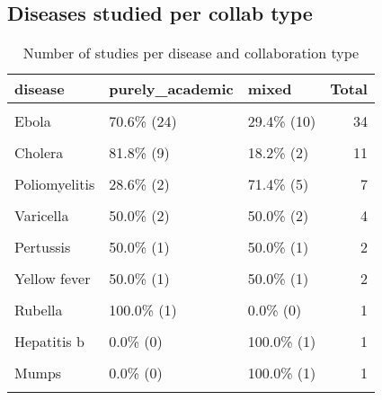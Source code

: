 \documentclass[
]{article}
\begin{document}
\hypertarget{diseases-studied-per-collab-type}{%
\subsection{Diseases studied per collab
type}\label{diseases-studied-per-collab-type}}

\begin{table}[H]

\caption{\label{tab:unnamed-chunk-18}Number of studies per disease and collaboration type}
\centering
\begin{tabular}[t]{lllr}
\toprule
disease & purely\_academic & mixed & Total\\
\midrule
\cellcolor{gray!6}{Influenza} & \cellcolor{gray!6}{54.1\%  (73)} & \cellcolor{gray!6}{45.9\%  (62)} & \cellcolor{gray!6}{135}\\
Ebola & 70.6\%  (24) & 29.4\%  (10) & 34\\
\cellcolor{gray!6}{Dengue} & \cellcolor{gray!6}{50.0\%   (6)} & \cellcolor{gray!6}{50.0\%   (6)} & \cellcolor{gray!6}{12}\\
Cholera & 81.8\%   (9) & 18.2\%   (2) & 11\\
\cellcolor{gray!6}{Measles} & \cellcolor{gray!6}{36.4\%   (4)} & \cellcolor{gray!6}{63.6\%   (7)} & \cellcolor{gray!6}{11}\\
\addlinespace
Poliomyelitis & 28.6\%   (2) & 71.4\%   (5) & 7\\
\cellcolor{gray!6}{Tuberculosis} & \cellcolor{gray!6}{83.3\%   (5)} & \cellcolor{gray!6}{16.7\%   (1)} & \cellcolor{gray!6}{6}\\
Varicella & 50.0\%   (2) & 50.0\%   (2) & 4\\
\cellcolor{gray!6}{Meningococcal meningitis} & \cellcolor{gray!6}{33.3\%   (1)} & \cellcolor{gray!6}{66.7\%   (2)} & \cellcolor{gray!6}{3}\\
Pertussis & 50.0\%   (1) & 50.0\%   (1) & 2\\
\addlinespace
\cellcolor{gray!6}{Pneumococcal disease} & \cellcolor{gray!6}{50.0\%   (1)} & \cellcolor{gray!6}{50.0\%   (1)} & \cellcolor{gray!6}{2}\\
Yellow fever & 50.0\%   (1) & 50.0\%   (1) & 2\\
\cellcolor{gray!6}{Hepatitis a} & \cellcolor{gray!6}{100.0\%   (1)} & \cellcolor{gray!6}{0.0\%   (0)} & \cellcolor{gray!6}{1}\\
Rubella & 100.0\%   (1) & 0.0\%   (0) & 1\\
\cellcolor{gray!6}{Typhoid} & \cellcolor{gray!6}{100.0\%   (1)} & \cellcolor{gray!6}{0.0\%   (0)} & \cellcolor{gray!6}{1}\\
\addlinespace
Hepatitis b & 0.0\%   (0) & 100.0\%   (1) & 1\\
\cellcolor{gray!6}{Malaria} & \cellcolor{gray!6}{0.0\%   (0)} & \cellcolor{gray!6}{100.0\%   (1)} & \cellcolor{gray!6}{1}\\
Mumps & 0.0\%   (0) & 100.0\%   (1) & 1\\
\cellcolor{gray!6}{Total} & \cellcolor{gray!6}{56.2\% (132)} & \cellcolor{gray!6}{43.8\% (103)} & \cellcolor{gray!6}{235}\\
\bottomrule
\end{tabular}
\end{table}
\end{document}
